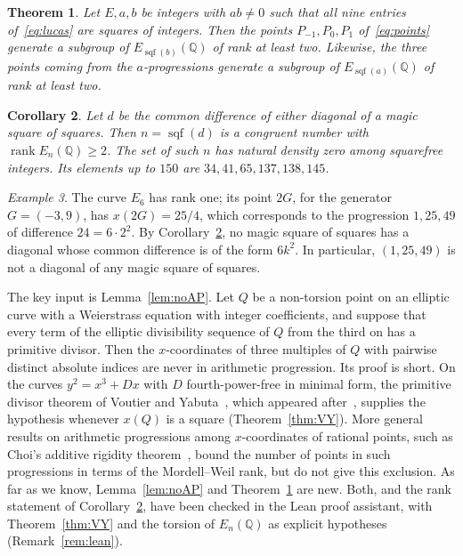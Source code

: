 \documentclass[11pt]{amsart}
\newtheorem{theorem}{Theorem}[section]
\newtheorem{corollary}[theorem]{Corollary}
\theoremstyle{definition}
\theoremstyle{remark}
\newtheorem{example}[theorem]{Example}
\newcommand{\Q}{\mathbb{Q}}
\DeclareMathOperator{\sqf}{sqf}
\DeclareMathOperator{\rk}{rank}
\begin{document}
\begin{theorem}\label{thm:main}
Let $E,a,b$ be integers with $ab\neq0$ such that all nine entries of~\eqref{eq:lucas} are squares of
integers. Then the points $P_{-1},P_0,P_1$ of~\eqref{eq:points} generate a subgroup of $E_{\sqf(b)}(\Q)$
of rank at least two. Likewise, the three points coming from the $a$-progressions generate a subgroup of
$E_{\sqf(a)}(\Q)$ of rank at least two.
\end{theorem}

\begin{corollary}\label{cor:rank}
Let $d$ be the common difference of either diagonal of a magic square of squares. Then $n=\sqf(d)$ is a
congruent number with $\rk E_n(\Q)\ge2$. The set of such $n$ has natural density zero among squarefree
integers. Its elements up to $150$ are $34,41,65,137,138,145$.
\end{corollary}

\begin{example}\label{ex:6}
The curve $E_6$ has rank one; its point $2G$, for the generator $G=(-3,9)$, has $x(2G)=25/4$, which
corresponds to the progression $1,25,49$ of difference $24=6\cdot2^2$. By Corollary~\ref{cor:rank}, no
magic square of squares has a diagonal whose common difference is of the form $6k^2$. In particular,
$(1,25,49)$ is not a diagonal of any magic square of squares.
\end{example}

The key input is Lemma~\ref{lem:noAP}. Let $Q$ be a non-torsion point on an elliptic curve with a
Weierstrass equation with integer coefficients, and suppose that every term of the elliptic divisibility
sequence of $Q$ from the third on has a primitive divisor. Then the $x$-coordinates of three multiples
of $Q$ with pairwise distinct absolute indices are never in arithmetic progression. Its proof is short.
On the curves $y^2=x^3+Dx$ with $D$ fourth-power-free in minimal form, the primitive divisor theorem of
Voutier and Yabuta~\cite{VY}, which appeared after~\cite{BST}, supplies the hypothesis whenever $x(Q)$
is a square (Theorem~\ref{thm:VY}). More
general results on arithmetic progressions among $x$-coordinates of rational points, such as Choi's
additive rigidity theorem~\cite{Choi}, bound the number of points in such progressions in terms of the
Mordell--Weil rank, but do not give this exclusion. As far as we know, Lemma~\ref{lem:noAP} and
Theorem~\ref{thm:main} are new. Both, and the rank statement of Corollary~\ref{cor:rank}, have been
checked in the Lean proof assistant, with Theorem~\ref{thm:VY} and the torsion of $E_n(\Q)$ as explicit
hypotheses (Remark~\ref{rem:lean}).
\end{document}
